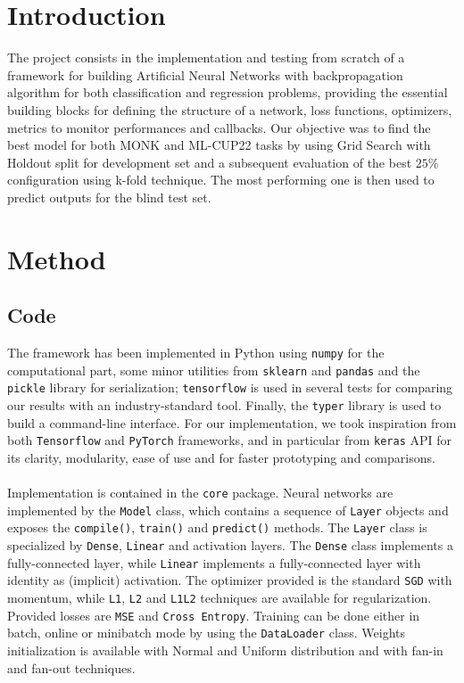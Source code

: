 \section{Introduction}

The project consists in the implementation and testing from scratch of a framework for building Artificial Neural Networks with backpropagation algorithm for both classification and regression problems, providing the essential building blocks for defining the structure of a network, loss functions, optimizers, metrics to monitor performances and callbacks. Our objective was to find the best model for both MONK and ML-CUP22 tasks by using Grid Search with Holdout split for development set and a subsequent evaluation of the best $25\%$ configuration using k-fold technique. The most performing one is then used to predict outputs for the blind test set.

\section{Method}

\subsection{Code}

The framework has been implemented in Python using \texttt{numpy} for the computational part, some minor utilities from \texttt{sklearn} and \texttt{pandas} and the \texttt{pickle} library for serialization; \texttt{tensorflow} is used in several tests for comparing our results with an industry-standard tool.
Finally, the \texttt{typer} library is used to build a command-line interface.
For our implementation, we took inspiration from both \texttt{Tensorflow} and \texttt{PyTorch} frameworks, and in particular from \texttt{keras} API for its clarity, modularity, ease of use and for faster prototyping and comparisons.

\paragraph{}

Implementation is contained in the \texttt{core} package. Neural networks are implemented by the \texttt{Model} class, which contains a sequence of \texttt{Layer} objects and exposes the \texttt{compile()}, \texttt{train()} and \texttt{predict()} methods. The \texttt{Layer} class is specialized by \texttt{Dense}, \texttt{Linear} and activation layers. The \texttt{Dense} class implements a fully-connected layer, while \texttt{Linear} implements a fully-connected layer with identity as (implicit) activation.
The optimizer provided is the standard \texttt{SGD} with momentum, while \texttt{L1}, \texttt{L2} and \texttt{L1L2} techniques are available for regularization. Provided losses are \texttt{MSE} and \texttt{Cross Entropy}. Training can be done either in batch, online or minibatch mode by using the \texttt{DataLoader} class. Weights initialization is available with Normal and Uniform distribution and with fan-in and fan-out techniques.

